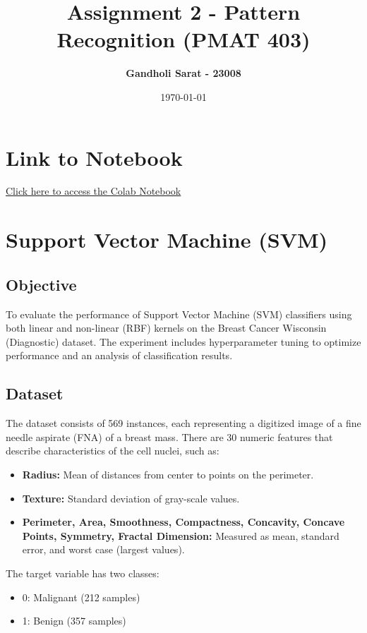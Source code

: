 \documentclass[a4paper,12pt]{article}
\title{\textbf{Assignment 2 - Pattern Recognition (PMAT 403)}}
\author{\textbf{Gandholi Sarat - 23008 } }
\date{\today}
\begin{document}
\maketitle


\section*{Link to Notebook}
\href{https://colab.research.google.com/drive/1akQzsGeXdW-E3hGgsELZqrQNJ5hUUqSV?usp=sharing}{Click here to access the Colab Notebook}

\tableofcontents
\listoffigures
\newpage


\section{Support Vector Machine (SVM) }

\subsection{Objective}
To evaluate the performance of Support Vector Machine (SVM) classifiers using both linear and non-linear (RBF) kernels on the Breast Cancer Wisconsin (Diagnostic) dataset. The experiment includes hyperparameter tuning to optimize performance and an analysis of classification results.

\subsection{Dataset}
The dataset consists of 569 instances, each representing a digitized image of a fine needle aspirate (FNA) of a breast mass. There are 30 numeric features that describe characteristics of the cell nuclei, such as:
\begin{itemize}
    \item \textbf{Radius:} Mean of distances from center to points on the perimeter.
    \item \textbf{Texture:} Standard deviation of gray-scale values.
    \item \textbf{Perimeter, Area, Smoothness, Compactness, Concavity, Concave Points, Symmetry, Fractal Dimension:} Measured as mean, standard error, and worst case (largest values).
\end{itemize}

The target variable has two classes:
\begin{itemize}
    \item 0: Malignant (212 samples)
    \item 1: Benign (357 samples)
\end{itemize}
\end{document}
